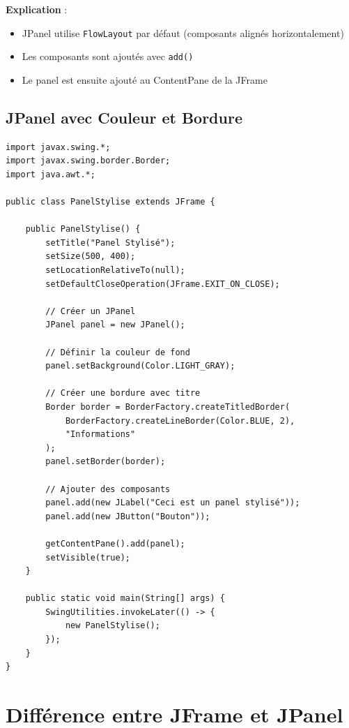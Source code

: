 \documentclass[11pt,a4paper]{article}
\begin{document}
\textbf{Explication} :
\begin{itemize}
    \item JPanel utilise \texttt{FlowLayout} par défaut (composants alignés horizontalement)
    \item Les composants sont ajoutés avec \texttt{add()}
    \item Le panel est ensuite ajouté au ContentPane de la JFrame
\end{itemize}

\subsection{JPanel avec Couleur et Bordure}

\begin{lstlisting}
import javax.swing.*;
import javax.swing.border.Border;
import java.awt.*;

public class PanelStylise extends JFrame {
    
    public PanelStylise() {
        setTitle("Panel Stylisé");
        setSize(500, 400);
        setLocationRelativeTo(null);
        setDefaultCloseOperation(JFrame.EXIT_ON_CLOSE);
        
        // Créer un JPanel
        JPanel panel = new JPanel();
        
        // Définir la couleur de fond
        panel.setBackground(Color.LIGHT_GRAY);
        
        // Créer une bordure avec titre
        Border border = BorderFactory.createTitledBorder(
            BorderFactory.createLineBorder(Color.BLUE, 2),
            "Informations"
        );
        panel.setBorder(border);
        
        // Ajouter des composants
        panel.add(new JLabel("Ceci est un panel stylisé"));
        panel.add(new JButton("Bouton"));
        
        getContentPane().add(panel);
        setVisible(true);
    }
    
    public static void main(String[] args) {
        SwingUtilities.invokeLater(() -> {
            new PanelStylise();
        });
    }
}
\end{lstlisting}

\newpage

\section{Différence entre JFrame et JPanel}
\end{document}

